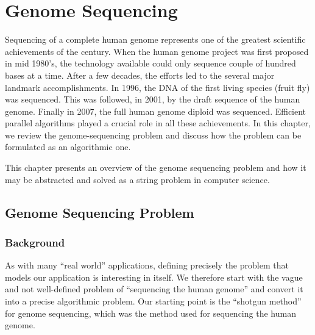 \chapter{Genome Sequencing}
\label{genome}

\begin{preamble}
Sequencing of a complete human genome represents one of the greatest
scientific achievements of the century.
%
When the human genome project was first proposed in mid 1980's, the
technology available could only sequence couple of hundred bases at a
time.
%
After a few decades, the efforts led to the several major landmark
accomplishments.
%
In 1996, the DNA of the first living species (fruit fly) was sequenced. 
%
This was followed, in 2001, by the draft sequence of the human genome.
%
Finally in 2007, the full human genome diploid was sequenced.
%
Efficient parallel algorithms played a crucial role in all these
achievements.  In this chapter, we review the genome-sequencing
problem and discuss how the problem can be formulated as an
algorithmic one.

This chapter presents an overview of the genome sequencing problem and how it may be abstracted and solved as a string problem in computer science.
\end{preamble}



\section{Genome Sequencing Problem}
\label{genome::prob}


\subsection{Background}


\begin{gram}


As with many ``real world'' applications, defining precisely the
problem that models our application is interesting in itself.  
%
We
therefore start with the vague and not well-defined problem of
``sequencing the human genome'' and convert it into a precise
algorithmic problem.  
%
Our starting point is the ``shotgun method'' for
genome sequencing, which was the method used for sequencing the human
genome.
\end{gram}



